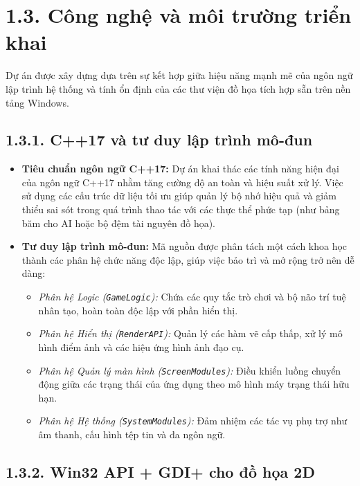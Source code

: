 \section*{1.3. Công nghệ và môi trường triển khai}

\noindent \indent Dự án được xây dựng dựa trên sự kết hợp giữa hiệu năng mạnh mẽ của ngôn ngữ lập trình hệ thống và tính ổn định của các thư viện đồ họa tích hợp sẵn trên nền tảng Windows.

\subsection*{1.3.1. C++17 và tư duy lập trình mô-đun}

\begin{itemize}
    \item \textbf{Tiêu chuẩn ngôn ngữ C++17:} Dự án khai thác các tính năng hiện đại của ngôn ngữ C++17 nhằm tăng cường độ an toàn và hiệu suất xử lý. Việc sử dụng các cấu trúc dữ liệu tối ưu giúp quản lý bộ nhớ hiệu quả và giảm thiểu sai sót trong quá trình thao tác với các thực thể phức tạp (như bảng băm cho AI hoặc bộ đệm tài nguyên đồ họa).
    \item \textbf{Tư duy lập trình mô-đun:} Mã nguồn được phân tách một cách khoa học thành các phân hệ chức năng độc lập, giúp việc bảo trì và mở rộng trở nên dễ dàng:
    \begin{itemize}
        \item \textit{Phân hệ Logic (\texttt{GameLogic}):} Chứa các quy tắc trò chơi và bộ não trí tuệ nhân tạo, hoàn toàn độc lập với phần hiển thị.
        \item \textit{Phân hệ Hiển thị (\texttt{RenderAPI}):} Quản lý các hàm vẽ cấp thấp, xử lý mô hình điểm ảnh và các hiệu ứng hình ảnh đạo cụ.
        \item \textit{Phân hệ Quản lý màn hình (\texttt{ScreenModules}):} Điều khiển luồng chuyển động giữa các trạng thái của ứng dụng theo mô hình máy trạng thái hữu hạn.
        \item \textit{Phân hệ Hệ thống (\texttt{SystemModules}):} Đảm nhiệm các tác vụ phụ trợ như âm thanh, cấu hình tệp tin và đa ngôn ngữ.
    \end{itemize}
\end{itemize}

\subsection*{1.3.2. Win32 API + GDI+ cho đồ họa 2D}

